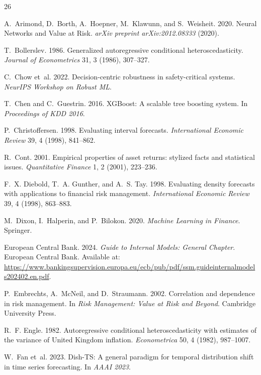 \documentclass[sigconf, anonymous]{acmart}
\begin{document}

\begin{thebibliography}{26}

A.~Arimond, D.~Borth, A.~Hoepner, M.~Klawunn, and S.~Weisheit. 2020. Neural Networks and Value at Risk. \textit{arXiv preprint arXiv:2012.08333} (2020).

T.~Bollerslev. 1986. Generalized autoregressive conditional heteroscedasticity.
\textit{Journal of Econometrics} 31, 3 (1986), 307--327.

C.~Chow et~al. 2022. Decision-centric robustness in safety-critical systems.
\textit{NeurIPS Workshop on Robust ML}.

T.~Chen and C.~Guestrin. 2016. XGBoost: A scalable tree boosting system.
In \textit{Proceedings of KDD 2016}.

P.~Christoffersen. 1998. Evaluating interval forecasts.
\textit{International Economic Review} 39, 4 (1998), 841--862.

R.~Cont. 2001. Empirical properties of asset returns: stylized facts and
statistical issues. \textit{Quantitative Finance} 1, 2 (2001), 223--236.

F.~X. Diebold, T.~A. Gunther, and A.~S. Tay. 1998. Evaluating density
forecasts with applications to financial risk management.
\textit{International Economic Review} 39, 4 (1998), 863--883.

M.~Dixon, I.~Halperin, and P.~Bilokon. 2020.
\textit{Machine Learning in Finance}. Springer.

European Central Bank. 2024. \textit{Guide to Internal Models: General Chapter}. European Central Bank. Available at: \url{https://www.bankingsupervision.europa.eu/ecb/pub/pdf/ssm.guideinternalmodels202402.en.pdf}.

P.~Embrechts, A.~McNeil, and D.~Straumann. 2002. Correlation and dependence
in risk management. In \textit{Risk Management: Value at Risk and Beyond}.
Cambridge University Press.

R.~F. Engle. 1982. Autoregressive conditional heteroscedasticity with
estimates of the variance of United Kingdom inflation.
\textit{Econometrica} 50, 4 (1982), 987--1007.

W.~Fan et~al. 2023. Dish-TS: A general paradigm for temporal distribution
shift in time series forecasting. In \textit{AAAI 2023}.


\end{thebibliography}
\end{document}
